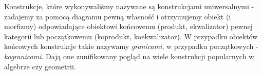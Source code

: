 %

\begin{remk}
  Konstrukcje, które wykonywaliśmy nazywane są konstrukcjami uniwersalnymi - zadajemy za pomocą diagramu pewną własność i otrzymujemy obiekt (i morfizmy) odpowiadające obiektowi końcowemu (produkt, ekwalizator) pewnej kategorii lub początkowemu (koprodukt, koekwalizator). W przypadku obiektów końcowych konstrukcje takie nazywamy \emph{granicami}, w przypadku początkowych - \emph{kogranicami}. Dają one zunifikowany pogląd na wiele konstrukcji popularnych w algebrze czy geometrii.
\end{remk}
